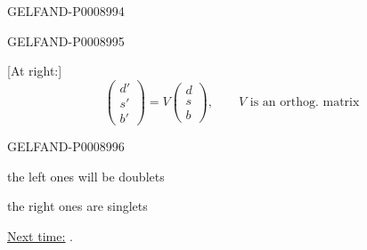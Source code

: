 \begin{GelfandAdjacentEvidence}{GELFAND-P000899}{4}

\end{GelfandAdjacentEvidence}
\begin{GelfandAdjacentEvidence}{GELFAND-P000899}{5}


[At right:]
\[
\begin{pmatrix}d'\\s'\\b'\end{pmatrix}
=V\begin{pmatrix}d\\s\\b\end{pmatrix},\qquad V\text{ is an orthog. matrix}
\]
\end{GelfandAdjacentEvidence}
\begin{GelfandAdjacentEvidence}{GELFAND-P000899}{6}


the left ones will be doublets

the right ones are singlets

\underline{\underline{Next time:}} .
\end{GelfandAdjacentEvidence}



\clearpage
{}
